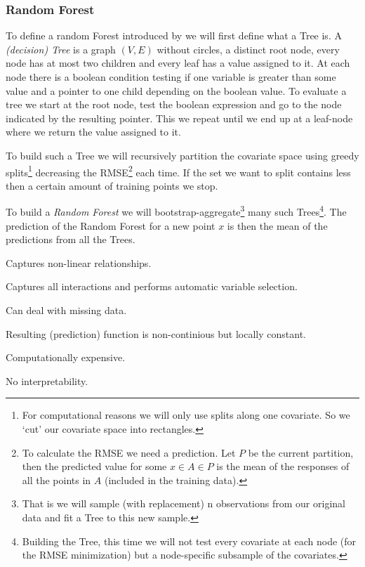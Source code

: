 \subsubsection*{Random Forest}{
    To define a random Forest introduced by \cite{breimanRandomForests2001}  we will first define what a Tree is. A \textit{(decision) Tree} is a graph $(V,E)$ without circles, a distinct root node, every node has at most two children and every leaf has a value assigned to it. At each node there is a boolean condition testing if one variable is greater than some value and a pointer to one child depending on the boolean value. To evaluate a tree we start at the root node, test the boolean expression and go to the node indicated by the resulting pointer. This we repeat until we end up at a leaf-node where we return the value assigned to it. 
    
    To build such a Tree we will recursively partition the covariate space using greedy splits\footnote{For computational reasons we will only use splits along one covariate. So we `cut' our covariate space into rectangles.} decreasing the RMSE\footnote{To calculate the RMSE we need a prediction. Let $P$ be the current partition, then the predicted value for some $x\in A \in P$ is the mean of the responses of all the points in $A$ (included in the training data).} each time. If the set we want to split contains less then a certain amount of training points we stop.
    
    To build a \textit{Random Forest} we will bootstrap-aggregate\footnote{That is we will sample (with replacement) n observations from our original data and fit a Tree to this new sample.} many such Trees\footnote{Building the Tree, this time we will not test every covariate at each node (for the RMSE minimization) but a node-specific subsample of the covariates.}. The prediction of the Random Forest for a new point $x$ is then the mean of the predictions from all the Trees. 
    \begin{my_pros_cons_table}{
        \item Captures non-linear relationships.
        \item Captures all interactions and performs automatic variable selection.
        \item Can deal with missing data.
    }{
        \item Resulting (prediction) function is non-continious but locally constant.
        \item Computationally expensive.
        \item No interpretability.
    }
    \end{my_pros_cons_table}
}
